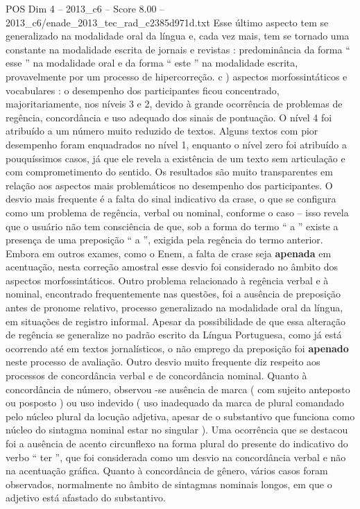\begin{textsample}{POS Dim 4 – 2013\_c6 – Score 8.00 – 2013\_c6/enade\_2013\_tec\_rad\_c2385d971d.txt}
Esse último aspecto tem se generalizado na modalidade oral da língua e, cada vez mais, tem se tornado uma constante na modalidade escrita de jornais e revistas : predominância da forma “ esse ” na modalidade oral e da forma “ este ” na modalidade escrita, provavelmente por um processo de hipercorreção. c ) aspectos morfossintáticos e vocabulares : o desempenho dos participantes ficou concentrado, majoritariamente, nos níveis 3 e 2, devido à grande ocorrência de problemas de regência, concordância e uso adequado dos sinais de pontuação.
O nível 4 foi atribuído a um número muito reduzido de textos.
Alguns textos com pior desempenho foram enquadrados no nível 1, enquanto o nível zero foi atribuído a pouquíssimos casos, já que ele revela a existência de um texto sem articulação e com comprometimento do sentido.
Os resultados são muito transparentes em relação aos aspectos mais problemáticos no desempenho dos participantes.
O desvio mais frequente é a falta do sinal indicativo da crase, o que se configura como um problema de regência, verbal ou nominal, conforme o caso – isso revela que o usuário não tem consciência de que, sob a forma do termo “ a ” existe a presença de uma preposição “ a ”, exigida pela regência do termo anterior.
Embora em outros exames, como o Enem, a falta de crase seja \textbf{apenada} em acentuação, nesta correção amostral esse desvio foi considerado no âmbito dos aspectos morfossintáticos.
Outro problema relacionado à regência verbal e à nominal, encontrado frequentemente nas questões, foi a ausência de preposição antes de pronome relativo, processo generalizado na modalidade oral da língua, em situações de registro informal.
Apesar da possibilidade de que essa alteração de regência se generalize no padrão escrito da Língua Portuguesa, como já está ocorrendo até em textos jornalísticos, o não emprego da preposição foi \textbf{apenado} neste processo de avaliação.
Outro desvio muito frequente diz respeito aos processos de concordância verbal e de concordância nominal.
Quanto à concordância de número, observou -se ausência de marca ( com sujeito anteposto ou posposto ) ou uso indevido ( uso inadequado da marca de plural comandado pelo núcleo plural da locução adjetiva, apesar de o substantivo que funciona como núcleo do sintagma nominal estar no singular ).
Uma ocorrência que se destacou foi a ausência de acento circunflexo na forma plural do presente do indicativo do verbo “ ter ”, que foi considerada como um desvio na concordância verbal e não na acentuação gráfica.
Quanto à concordância de gênero, vários casos foram observados, normalmente no âmbito de sintagmas nominais longos, em que o adjetivo está afastado do substantivo.

\end{textsample}
